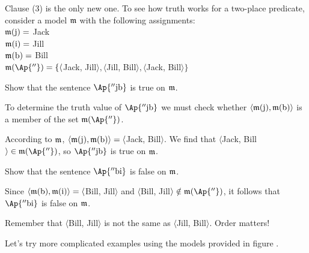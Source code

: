 \noindent{}Clause (3) is the only new one. To see how \GQL{} truth works for a two-place predicate, consider a model $\mathfrak{m}$ with the following assignments:\\

\noindent{}$\mathfrak{m}(\mathrm{j})=$ Jack\\
\noindent{}$\mathfrak{m}(\mathrm{i})=$ Jill\\
\noindent{}$\mathfrak{m}(\mathrm{b})=$ Bill\\
\noindent{}$\IntA(\Ap{''})=\{\langle$Jack, Jill$\rangle, \langle$Jill, Bill$\rangle, \langle$Jack, Bill$\rangle\}$\\

\begin{majorILnc}{}
Show that the sentence $\Ap{''\constant{j}\constant{b}}$ is true on $\mathfrak{m}$.
\end{majorILnc}
\begin{commentary}
	To determine the truth value of $\Ap{''\constant{j}\constant{b}}$ we must check whether $\langle\mathfrak{m}(\mathrm{j}),\mathfrak{m}(\mathrm{b})\rangle$ is a member of the set $\IntA(\Ap{''})$. 
\end{commentary}
\begin{PROOF}
	According to $\mathfrak{m}$, $\langle\mathfrak{m}(\mathrm{j}),\mathfrak{m}(\mathrm{b})\rangle=\langle$Jack, Bill$\rangle$. 
	We find that $\langle$Jack, Bill$\rangle\in\IntA(\Ap{''})$, so $\Ap{''\constant{j}\constant{b}}$ is true on $\mathfrak{m}$.
\end{PROOF}

\begin{majorILnc}{}
Show that the sentence $\Ap{''\constant{b}\constant{i}}$ is false on $\mathfrak{m}$.
\end{majorILnc}
\begin{PROOF}
	Since $\langle\mathfrak{m}(\mathrm{b}),\mathfrak{m}(\mathrm{i})\rangle=\langle$Bill, Jill$\rangle$ and $\langle$Bill, Jill$\rangle\notin\IntA(\Ap{''})$, it follows that $\Ap{''\constant{b}\constant{i}}$ is false on $\mathfrak{m}$.
\end{PROOF}
\begin{commentary}
	Remember that $\langle$Bill, Jill$\rangle$ is not the same as $\langle$Jill, Bill$\rangle$.  Order matters!
\end{commentary}

\noindent{}Let's try more complicated examples using the models provided in figure .


